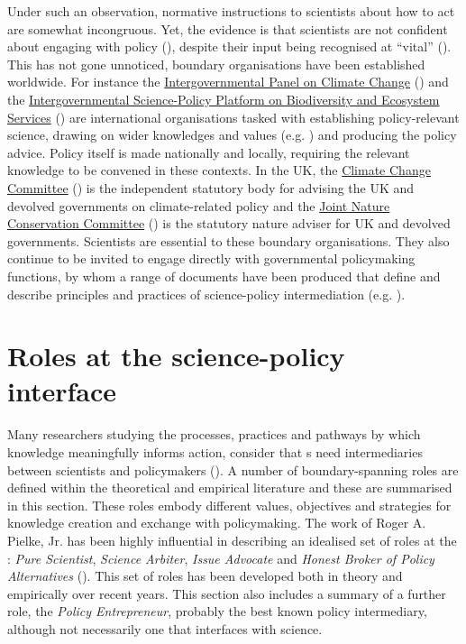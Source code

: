 Under such an observation, normative instructions to scientists about how to act are somewhat incongruous. Yet, the evidence is that scientists are not confident about engaging with policy (\cite{KEU2021perceptions}), despite their input being recognised at ``vital'' (\cite{KennyRHTB2017}). This has not gone unnoticed, \SPI{} boundary organisations have been established worldwide. For instance the \href{https://www.ipcc.ch/}{Intergovernmental Panel on Climate Change} (\IPCC) and the \href{https://www.ipbes.net/}{Intergovernmental Science-Policy Platform on Biodiversity and Ecosystem Services} (\IPBES) are international organisations tasked with establishing policy-relevant science, drawing on wider knowledges and values (e.g. \cite{PascualEtAl2018,MatukBSAHT2020})  and producing the policy advice. Policy itself is made nationally and locally, requiring the relevant knowledge to be convened in these contexts. In the UK, the \href{https://www.theccc.org.uk/}{Climate Change Committee} (\CCC) is the independent statutory body for advising the UK and devolved governments on climate-related policy and the \href{https://jncc.gov.uk/}{Joint Nature Conservation Committee} (\JNCC) is the statutory nature adviser for UK and devolved governments. Scientists are essential to these boundary organisations. They also continue to be invited to engage directly with governmental policymaking functions, by whom a range of documents have been produced that define and describe principles and practices of science-policy intermediation (e.g. \cite{OECD2015,DottiACDMPSVW2024,KarkkainenLKK2024}). 

\section{Roles at the science-policy interface}\label{sec:litroles}

Many researchers studying the processes, practices and pathways by which knowledge meaningfully informs action, consider that \SPI s need intermediaries between scientists and policymakers (\cite{JagannathanEtAl2023}). A number of boundary-spanning roles are defined within the theoretical and empirical literature and these are summarised in this section. These roles embody different values, objectives and strategies for knowledge creation and exchange with policymaking. The work of Roger A. Pielke, Jr. has been highly influential in describing an idealised set of roles at the \SPI: \emph{Pure Scientist}, \emph{Science Arbiter}, \emph{Issue Advocate} and \emph{Honest Broker of Policy Alternatives} (\cite{Pielke2007}). This set of roles has been developed both in theory and empirically over recent years. This section also includes a summary of a further role, the \emph{Policy Entrepreneur}, probably the best known policy intermediary, although not necessarily one that interfaces with science.

